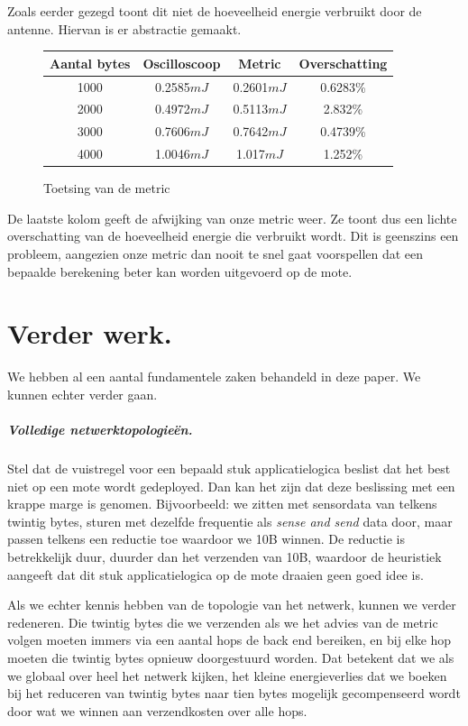 \documentclass[11pt]{article}
\begin{document}
Zoals eerder gezegd toont dit niet de hoeveelheid energie verbruikt door de antenne. Hiervan is er abstractie gemaakt. 

\begin{figure}[H]
\begin{tabular}{|c|c|c|c|}
\hline 
\cellcolor[gray]{0.8}Aantal bytes & \cellcolor[gray]{0.8} Oscilloscoop  & \cellcolor[gray]{0.8} Metric & \cellcolor[gray]{0.8} Overschatting \\ 
\hline 
1000 & 0.2585$mJ$ & 0.2601$mJ$ & 0.6283\% \\ 
\hline 
2000 & 0.4972$mJ$ & 0.5113$mJ$ & 2.832\% \\ 
\hline 
3000 & 0.7606$mJ$ & 0.7642$mJ$ & 0.4739\% \\ 
\hline 
4000 & 1.0046$mJ$ & 1.017$mJ$ & 1.252\% \\ 
\hline 
\end{tabular} 

\caption{Toetsing van de metric}
\label{tab:toetsing}
\end{figure}

De laatste kolom geeft de afwijking van onze metric weer. Ze toont dus een
lichte overschatting van de hoeveelheid energie die verbruikt wordt. Dit is
geenszins een probleem, aangezien onze metric dan nooit te snel gaat voorspellen dat
een bepaalde berekening beter kan worden uitgevoerd op de mote.

\section{Verder werk.} 

We hebben al een aantal fundamentele zaken behandeld in deze paper. We kunnen
echter verder gaan.
 
\subparagraph{Volledige netwerktopologie\"en.}

Stel dat de vuistregel voor een bepaald stuk applicatielogica beslist dat het
best niet op een mote wordt gedeployed. Dan kan het zijn dat deze beslissing met
een krappe marge is genomen. Bijvoorbeeld: we zitten met sensordata van telkens
twintig bytes, sturen met dezelfde frequentie als \textit{sense and send} data door, maar
passen telkens een reductie toe waardoor we 10B winnen. De reductie is
betrekkelijk duur, duurder dan het verzenden van 10B, waardoor de heuristiek
aangeeft dat dit stuk applicatielogica op de mote draaien geen goed idee is. 

Als we echter kennis hebben van de topologie van het netwerk, kunnen we verder
redeneren. Die twintig bytes die we verzenden als we het advies van de metric
volgen moeten immers via een aantal hops de back end bereiken, en bij elke hop
moeten die twintig bytes opnieuw doorgestuurd worden. Dat betekent dat we als we
globaal over heel het netwerk kijken, het kleine energieverlies dat we boeken
bij het reduceren van twintig bytes naar tien bytes mogelijk gecompenseerd wordt
door wat we winnen aan verzendkosten over alle hops.
\end{document}
